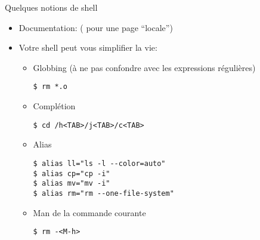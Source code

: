 \begin{frame}[fragile=singleslide]{Quelques notions de shell}
  \begin{itemize}
  \item   Documentation:    (  pour   une  page
    ``locale'')
  \item Votre shell peut vous simplifier la vie:
    \begin{itemize}
    \item  Globbing   (à  ne   pas  confondre  avec   les  expressions
      régulières)
      \begin{lstlisting}
$ rm *.o
      \end{lstlisting}
    \item Complétion
      \begin{lstlisting}
$ cd /h<TAB>/j<TAB>/c<TAB>
      \end{lstlisting}
    \item Alias
      \begin{lstlisting}
$ alias ll="ls -l --color=auto"
$ alias cp="cp -i"
$ alias mv="mv -i"
$ alias rm="rm --one-file-system"
      \end{lstlisting} %
    \item Man de la commande courante
      \begin{lstlisting}
$ rm -<M-h>
      \end{lstlisting} %
    \end{itemize}
     
  \end{itemize}
\end{frame}

